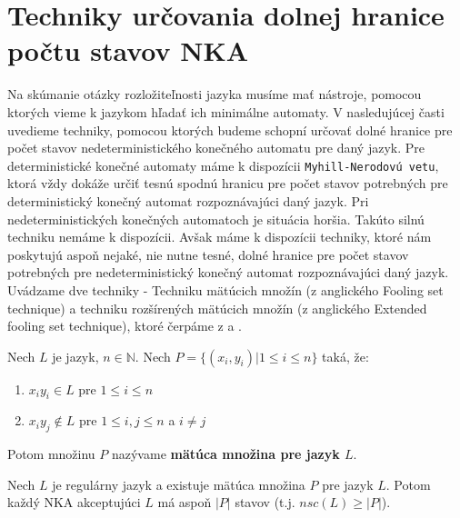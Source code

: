 \section{Techniky určovania dolnej hranice počtu stavov NKA}

Na skúmanie otázky rozložiteľnosti jazyka musíme mať nástroje, pomocou ktorých vieme k jazykom hľadať ich minimálne automaty. V nasledujúcej časti uvedieme techniky, pomocou ktorých budeme schopní určovať dolné hranice pre počet stavov nedeterministického konečného automatu pre daný jazyk. Pre deterministické konečné automaty máme k dispozícii \verb'Myhill-Nerodovú vetu', ktorá vždy dokáže určiť tesnú spodnú hranicu pre počet stavov potrebných pre deterministický konečný automat rozpoznávajúci daný jazyk. Pri nedeterministických konečných automatoch je situácia horšia. Takúto silnú techniku nemáme k dispozícii. Avšak máme k dispozícii techniky, ktoré nám poskytujú aspoň nejaké, nie nutne tesné, dolné hranice pre počet stavov potrebných pre nedeterministický konečný automat rozpoznávajúci daný jazyk. Uvádzame dve techniky - Techniku mätúcich množín (z anglického Fooling set technique) a techniku rozšírených mätúcich množín (z anglického Extended fooling set technique), ktoré čerpáme z \cite{Palioudakis2012} a \cite{GlaisterShalit1996}.

\begin{definition}
\label{def:fooling_set}
Nech $ L $ je jazyk, $ n \in \mathbb{N} $. Nech $ P = \lbrace (x_{i},y_{i}) | 1 \leq i \leq n \rbrace $ taká, že: 

\begin{enumerate}[label=(\alph*)]
\item $x_{i}y_{i} \in L$ pre $1 \leq i \leq n$
\item $x_{i}y_{j} \notin L$ pre $1 \leq i,j \leq n$ a $i \neq j$
\end{enumerate}

Potom množinu $ P $ nazývame \textbf{mätúca množina pre jazyk $ L $}.
\end{definition}

\begin{theorem}
\label{thm:fooling_set_technique}
Nech $ L $ je regulárny jazyk a existuje mätúca množina $ P $ pre jazyk $ L $. Potom každý NKA akceptujúci $ L $ má aspoň $ |P| $ stavov (t.j. $ nsc(L) \geq |P| $).
\end{theorem}

